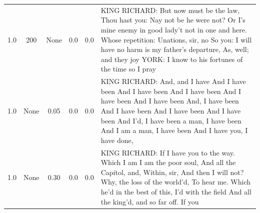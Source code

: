 \documentclass[11pt]{book}
\begin{document}
\begin{longtable}{ccccc p{12cm}}
    1.0 & 200 & None & 0.0 & 0.0 &
    KING RICHARD:\newline
    But now must be the law,\newline
    Thou hast you:\newline
    Nay not be he were not?\newline
    Or I's mine enemy in good lady't not in one and here.\newline
    Whose repetition:\newline
    Unations, sir, no\newline
    So you: I will have no harm is my father's departure,\newline
    As, well; and they joy\newline
    YORK:\newline
    I know to his fortunes of the time so I pray\\
    
    1.0 & None & 0.05 & 0.0 & 0.0 &
    KING RICHARD:\newline
    And, and I have\newline
    And I have been\newline
    And I have been\newline
    And I have been\newline
    And I have been\newline
    And I have been\newline
    And, I have been\newline
    And I have been\newline
    And I have been\newline
    And I have been\newline
    And I'd, I have been a man, I have been\newline
    And I am a man, I have been\newline
    And I have you, I have done,\\
    
    1.0 & None & 0.30 & 0.0 & 0.0 &
    KING RICHARD:\newline
    If I have you to the way.\newline
    Which I am I am the poor soul,\newline
    And all the Capitol, and,\newline
    Within, sir,\newline
    And then I will not?\newline
    Why, the loss of the world'd,\newline
    To hear me.\newline
    Which he'd in the best of this,\newline
    I'd with the field\newline
    And all the king'd, and so far off.\newline
    If you\\
    

\end{longtable}
\end{document}
